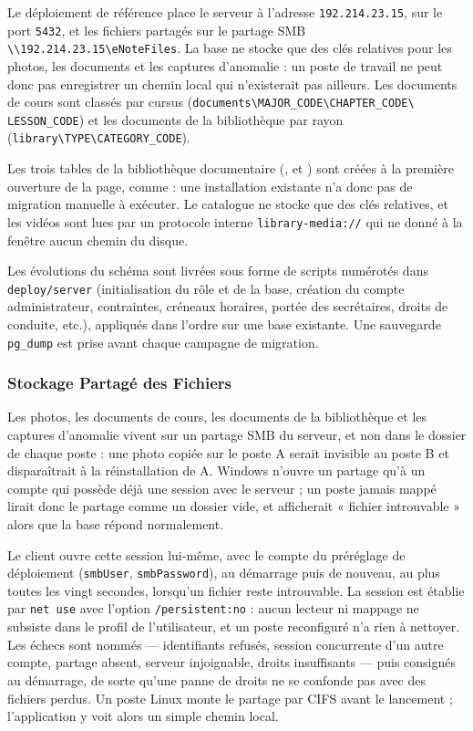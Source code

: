 Le déploiement de référence place le serveur à l'adresse \texttt{192.214.23.15}, sur le port
\texttt{5432}, et les fichiers partagés sur le partage \ac{SMB} \texttt{\textbackslash\textbackslash 192.214.23.15}\allowbreak\texttt{\textbackslash eNoteFiles}. La base ne stocke que des clés relatives pour les photos, les
documents et les captures d'anomalie : un poste de travail ne peut donc pas enregistrer un chemin local
qui n'existerait pas ailleurs. Les documents de cours sont classés par cursus
(\texttt{documents\textbackslash MAJOR\_CODE\textbackslash CHAPTER\_CODE\textbackslash
LESSON\_CODE}) et les documents de la bibliothèque par rayon
(\texttt{library\textbackslash TYPE\textbackslash CATEGORY\_CODE}).

Les trois tables de la bibliothèque documentaire (,  et
) sont créées à la première ouverture de la page, comme  :
une installation existante n'a donc pas de migration manuelle à exécuter. Le catalogue ne stocke que
des clés relatives, et les vidéos sont lues par un protocole interne \texttt{library-media://} qui ne
donné à la fenêtre aucun chemin du disque.\par

Les évolutions du schéma sont livrées sous forme de scripts numérotés dans
\texttt{deploy/server} (initialisation du rôle et de la base, création du compte administrateur,
contraintes, créneaux horaires, portée des secrétaires, droits de conduite, etc.), appliqués dans
l'ordre sur une base existante. Une sauvegarde \texttt{pg\_dump} est prise avant chaque campagne de
migration.

\subsubsection{Stockage Partagé des Fichiers}
Les photos, les documents de cours, les documents de la bibliothèque et les captures d'anomalie vivent
sur un partage \ac{SMB} du serveur, et non dans le dossier de chaque poste : une photo copiée sur le
poste A serait invisible au poste B et disparaîtrait à la réinstallation de A. Windows n'ouvre un
partage qu'à un compte qui possède déjà une session avec le serveur ; un poste jamais mappé lirait
donc le partage comme un dossier vide, et afficherait « fichier introuvable » alors que la base
répond normalement.

Le client ouvre cette session lui-même, avec le compte du préréglage de déploiement
(\texttt{smbUser}, \texttt{smbPassword}), au démarrage puis de nouveau, au plus toutes les vingt
secondes, lorsqu'un fichier reste introuvable. La session est établie par \texttt{net use} avec
l'option \texttt{/persistent:no} : aucun lecteur ni mappage ne subsiste dans le profil de
l'utilisateur, et un poste reconfiguré n'a rien à nettoyer. Les échecs sont nommés — identifiants
refusés, session concurrente d'un autre compte, partage absent, serveur injoignable, droits
insuffisants — puis consignés au démarrage, de sorte qu'une panne de droits ne se confonde pas avec
des fichiers perdus. Un poste Linux monte le partage par CIFS avant le lancement ; l'application
y voit alors un simple chemin local.

